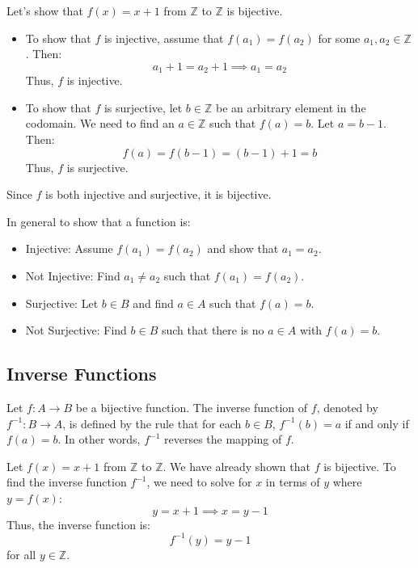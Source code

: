 \begin{eg}
    Let's show that $f(x) = x + 1$ from $\mathbb{Z}$ to $\mathbb{Z}$ is bijective.
    \begin{itemize}[itemsep=1pt,label=$\circ$]
        \item To show that $f$ is injective, assume that $f(a_1) = f(a_2)$ for some $a_1, a_2 \in \mathbb{Z}$. Then:
        \[ a_1 + 1 = a_2 + 1 \implies a_1 = a_2 \]
        Thus, $f$ is injective.
        \item To show that $f$ is surjective, let $b \in \mathbb{Z}$ be an arbitrary element in the codomain. We need to find an $a \in \mathbb{Z}$ such that $f(a) = b$. Let $a = b - 1$. Then:
        \[ f(a) = f(b - 1) = (b - 1) + 1 = b \]
        Thus, $f$ is surjective.
    \end{itemize}
    Since $f$ is both injective and surjective, it is bijective.
\end{eg}
In general to show that a function is:
\begin{itemize}[itemsep=1pt,label=$\circ$]
    \item Injective: Assume $f(a_1) = f(a_2)$ and show that $a_1 = a_2$.
    \item Not Injective: Find $a_1 \neq a_2$ such that $f(a_1) = f(a_2)$.
    \item Surjective: Let $b \in B$ and find $a \in A$ such that $f(a) = b$.
    \item Not Surjective: Find $b \in B$ such that there is no $a \in A$ with $f(a) = b$.
\end{itemize}
\subsection{Inverse Functions}
\begin{definition}
    Let $f: A \to B$ be a bijective function. The inverse function of $f$, denoted by $f^{-1}: B \to A$, is defined by the rule that for each $b \in B$, $f^{-1}(b) = a$ if and only if $f(a) = b$. In other words, $f^{-1}$ reverses the mapping of $f$.
\end{definition}
\begin{eg}
    Let $f(x) = x + 1$ from $\mathbb{Z}$ to $\mathbb{Z}$. We have already shown that $f$ is bijective. To find the inverse function $f^{-1}$, we need to solve for $x$ in terms of $y$ where $y = f(x)$:
    \[ y = x + 1 \implies x = y - 1 \]
    Thus, the inverse function is:
    \[ f^{-1}(y) = y - 1 \]
    for all $y \in \mathbb{Z}$.
\end{eg}

